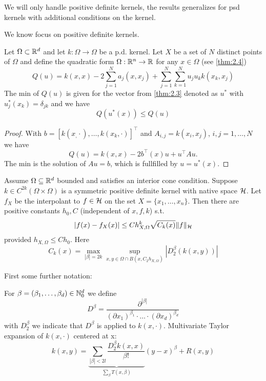 \begin{aremark}
    We will only handle positive definite kernels, the results generalizes for psd kernels with additional conditions on the kernel.
\end{aremark}

We know focus on positive definite kernels. 
\begin{theorem}\label{thm:31}
    Let $\Omega\subset \mathbb{R}^d$ and let $k:\Omega\to\Omega$ be a p.d. kernel. 
    Let $X$ be a set of $N$ distinct points of $\Omega$ and define the quadratic form 
    $\Omega:\mathbb{R}^n\to\mathbb{R}$ for any $x\in\Omega$ (see \ref{thm:2.4})
    \[Q(u)=k(x,x)-2\sum_{j=1}^N a_j(x,x_j)+\sum_{j=1}^{N}\sum_{k=1}^{N}u_ju_kk(x_k,x_j)\]
    The min of $Q(u)$ is given for the vector from \ref{thm:2.3} denoted as $u^*$ with 
    $u_j^*(x_k)=\delta_{jk}$ and we have \[Q(u^*(x))\leq Q(u)\]
\end{theorem}

\begin{proof}
    With $b=[k(x_,\cdot),\dots,k(x_k,\cdot)]^\intercal$ and $A_{i,j}=k(x_i,x_j)$, $i,j=1,\dots,N$ 
    we have 
    \[ Q(u)=k(x,x)-2 b^\intercal (x)u+u^\intercal A u.\]
    The min is the solution of $Au=b$,
    which is fullfilled by $u=u^*(x)$.
\end{proof}

\begin{theorem}\label{thm:32}
    Assume $\Omega\subseteq \mathbb{R}^d$ bounded and satisfies an interior cone condition.
    Suppose $k\in C^{2k}(\Omega\times \Omega)$ is a symmetric positive definite kernel 
    with native space $\mathcal{H}$. Let $f_X$ be the interpolant to $f\in\mathcal{H}$ on the set $X=\{x_1,\dots,x_n\}$.
    Then there are positive constants $h_0,C$ (independent of $x,f,k$) s.t. 
    \begin{equation*}
        |f(x)-f_X(x)|\leq Ch_{X,\Omega}^k \sqrt{C_k(x)}\Vert f\Vert_{\mathcal{H}}
    \end{equation*} 
    provided $h_{X,\Omega}\leq Ch_0$. Here 
    \[C_k(x)=\max_{|\beta|=2k} \sup_{x,y\in \Omega\cap B(x,C_2h_{X,\Omega})}\left\vert D_2^\beta (k(x,y))\right\vert\]
\end{theorem}

First some further notation:

For $\beta=(\beta_1,\dots,\beta_d)\in\mathbb{N}_0^d$ we define 
\[D^\beta=\frac{\partial^{|\beta|}}{(\partial x_1)^{\beta_1}\cdot\dots\cdot (\partial x_d)^{\beta_d}}\]
with $D_2^\beta$ we indicate that $D^\beta$ is applied to $k(x,\cdot)$. Multivariate 
Taylor expansion of $k(x,\cdot)$ centered at x:
\[k(x,y)=\underbrace{\sum_{|\beta|<2l}\frac{D_2^\beta k(x,x)}{\beta!}}_{\sum_\beta T(x,\beta)}(y-x)^\beta+R(x,y)\] 

